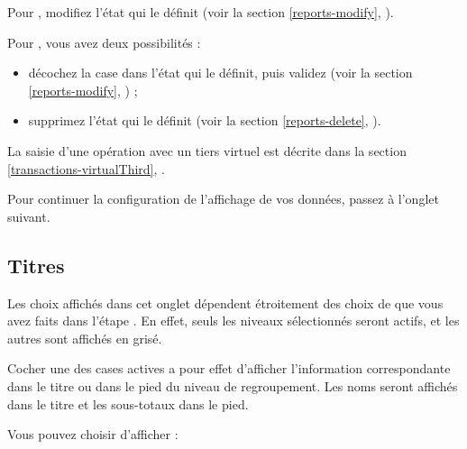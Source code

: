 Pour , modifiez l'état qui le définit (voir la section \vref{reports-modify}, ).

Pour , vous avez deux possibilités :

\begin{itemize}
	\item décochez la case  dans l'état qui le définit, puis validez (voir la section \vref{reports-modify}, ) ;
	\item supprimez l'état qui le définit (voir la section \vref{reports-delete}, ).
\end{itemize}

La saisie d'une opération avec un tiers virtuel est décrite dans la section \vref{transactions-virtualThird}, .

Pour continuer la configuration de l'affichage de vos données, passez à l'onglet suivant.


\subsection{Titres\label{reportscreation-display-titles}}

Les choix affichés dans cet onglet dépendent étroitement des choix de  que vous avez faits dans l'étape . En effet, seuls les niveaux sélectionnés seront actifs, et les autres sont \ifIllustration affichés en grisé. 

Cocher une des cases actives a pour effet d'afficher l'information correspondante dans le titre ou dans le pied du niveau de regroupement. Les noms seront affichés dans le titre et les sous-totaux dans le pied.

Vous pouvez choisir d'afficher :

